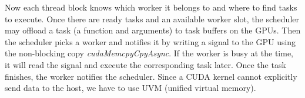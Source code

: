 
Now each thread block knows which worker it belongs to and where to find tasks to execute.
Once there are ready tasks and an available worker slot, the scheduler may offload a task (a function and arguments) to task buffers on the GPUs.
Then the scheduler picks a worker and notifies it by writing a signal to the GPU using the non-blocking copy {\em cudaMemcpyCpyAsync}.
If the worker is busy at the time, it will read the signal and execute the corresponding task later.
Once the task finishes, the worker notifies the scheduler.
Since a CUDA kernel cannot explicitly send data to the host, we have to use UVM (unified virtual memory).
